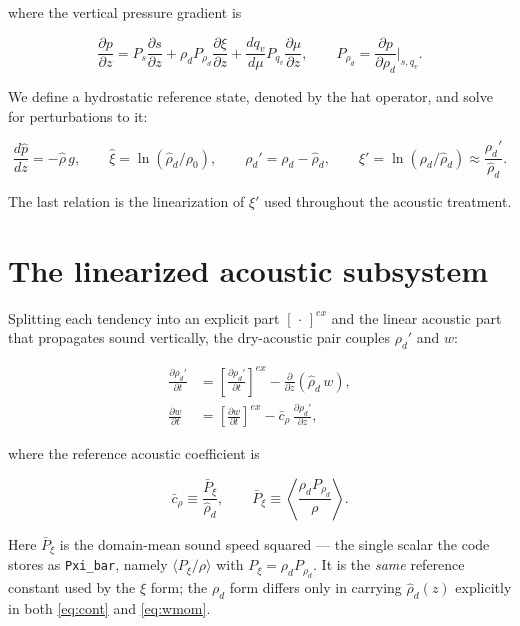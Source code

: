 \documentclass[11pt, oneside]{article}   	%
\begin{document}
where the vertical pressure gradient is

\begin{equation}
\frac{\partial p}{\partial z} = P_s \frac{\partial s}{\partial z}
   + \rho_d P_{\rho_d}\frac{\partial \xi}{\partial z}
   + \frac{dq_v}{d\mu}P_{q_v}\frac{\partial \mu}{\partial z} ,
\qquad
P_{\rho_d} = \frac{\partial p}{\partial \rho_d}\bigg\vert_{s,q_v} .
\end{equation}

We define a hydrostatic reference state, denoted by the hat operator, and solve for
perturbations to it:

\begin{equation}
\frac{d\hat{p}}{dz} = -\hat{\rho}\,g , \qquad
\hat{\xi} = \ln(\hat{\rho}_d/\rho_0) , \qquad
\rho_d' = \rho_d - \hat{\rho}_d , \qquad
\xi' = \ln(\rho_d/\hat{\rho}_d) \approx \frac{\rho_d'}{\hat{\rho}_d} .
\end{equation}

The last relation is the linearization of $\xi'$ used throughout the acoustic
treatment.

\section{The linearized acoustic subsystem}

Splitting each tendency into an explicit part $[\,\cdot\,]^{ex}$ and the linear
acoustic part that propagates sound vertically, the dry-acoustic pair couples
$\rho_d'$ and $w$:

\begin{align}
\frac{\partial \rho_d'}{\partial t} &= \left[\frac{\partial \rho_d'}{\partial t}\right]^{ex}
   - \frac{\partial}{\partial z}\left(\hat{\rho}_d\, w\right) , \label{eq:cont} \\
\frac{\partial w}{\partial t} &= \left[\frac{\partial w}{\partial t}\right]^{ex}
   - \bar{c}_\rho\,\frac{\partial \rho_d'}{\partial z} , \label{eq:wmom}
\end{align}

where the reference acoustic coefficient is

\begin{equation}
\bar{c}_\rho \equiv \frac{\bar{P}_\xi}{\hat{\rho}_d} , \qquad
\bar{P}_\xi \equiv \left\langle \frac{\rho_d P_{\rho_d}}{\rho} \right\rangle .
\label{eq:cbar}
\end{equation}

Here $\bar{P}_\xi$ is the domain-mean sound speed squared --- the single scalar the
code stores as \texttt{Pxi\_bar}, namely $\langle P_\xi / \rho \rangle$ with
$P_\xi = \rho_d P_{\rho_d}$. It is the \emph{same} reference constant used by the $\xi$
form; the $\rho_d$ form differs only in carrying $\hat{\rho}_d(z)$ explicitly in both
\eqref{eq:cont} and \eqref{eq:wmom}.
\end{document}
